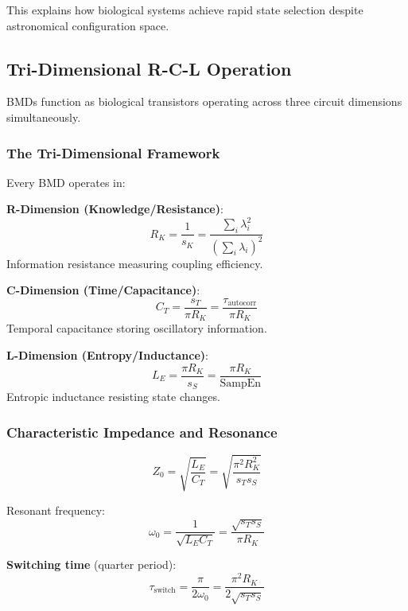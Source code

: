 \documentclass[11pt,onecolumn]{article}
\begin{document}
This explains how biological systems achieve rapid state selection despite astronomical configuration space.

\subsection{Tri-Dimensional R-C-L Operation}

BMDs function as biological transistors operating across three circuit dimensions simultaneously.

\subsubsection{The Tri-Dimensional Framework}

Every BMD operates in:

\textbf{R-Dimension (Knowledge/Resistance)}:
\begin{equation}
R_K = \frac{1}{s_K} = \frac{\sum_i \lambda_i^2}{(\sum_i \lambda_i)^2}
\end{equation}
Information resistance measuring coupling efficiency.

\textbf{C-Dimension (Time/Capacitance)}:
\begin{equation}
C_T = \frac{s_T}{\pi R_K} = \frac{\tau_{\text{autocorr}}}{\pi R_K}
\end{equation}
Temporal capacitance storing oscillatory information.

\textbf{L-Dimension (Entropy/Inductance)}:
\begin{equation}
L_E = \frac{\pi R_K}{s_S} = \frac{\pi R_K}{\text{SampEn}}
\end{equation}
Entropic inductance resisting state changes.

\subsubsection{Characteristic Impedance and Resonance}

\begin{equation}
Z_0 = \sqrt{\frac{L_E}{C_T}} = \sqrt{\frac{\pi^2 R_K^2}{s_T s_S}}
\end{equation}

Resonant frequency:
\begin{equation}
\omega_0 = \frac{1}{\sqrt{L_E C_T}} = \frac{\sqrt{s_T s_S}}{\pi R_K}
\end{equation}

\textbf{Switching time} (quarter period):
\begin{equation}
\tau_{\text{switch}} = \frac{\pi}{2\omega_0} = \frac{\pi^2 R_K}{2\sqrt{s_T s_S}}
\end{equation}
\end{document}
